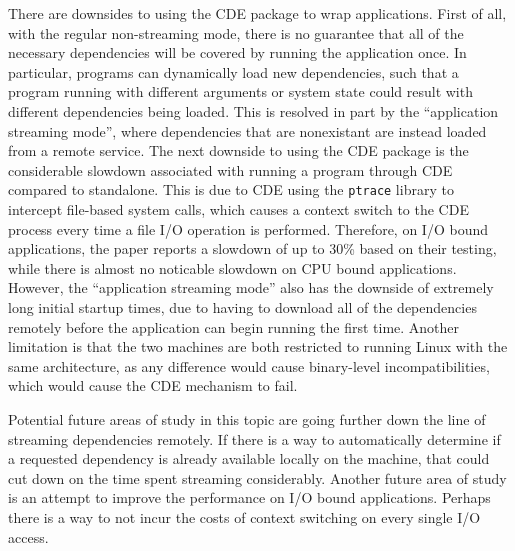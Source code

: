 \documentclass[11pt]{article}
\newcommand{\cde}{\textsc{CDE}\xspace}
\begin{document}
There are downsides to using the \cde package to wrap applications. First of all, with the regular non-streaming mode, there is no guarantee that all of the necessary dependencies will be covered by running the application once. In particular, programs can dynamically load new dependencies, such that a program running with different arguments or system state could result with different dependencies being loaded. This is resolved in part by the ``application streaming mode'', where dependencies that are nonexistant are instead loaded from a remote service. The next downside to using the \cde package is the considerable slowdown associated with running a program through \cde compared to standalone. This is due to \cde using the \texttt{ptrace} library to intercept file-based system calls, which causes a context switch to the \cde process every time a file I/O operation is performed. Therefore, on I/O bound applications, the paper reports a slowdown of up to 30\% based on their testing, while there is almost no noticable slowdown on CPU bound applications. However, the ``application streaming mode'' also has the downside of extremely long initial startup times, due to having to download all of the dependencies remotely before the application can begin running the first time. Another limitation is that the two machines are both restricted to running Linux with the same architecture, as any difference would cause binary-level incompatibilities, which would cause the \cde mechanism to fail.

Potential future areas of study in this topic are going further down the line of streaming dependencies remotely. If there is a way to automatically determine if a requested dependency is already available locally on the machine, that could cut down on the time spent streaming considerably.
Another future area of study is an attempt to improve the performance on I/O bound applications. Perhaps there is a way to not incur the costs of context switching on every single I/O access.
\end{document}

